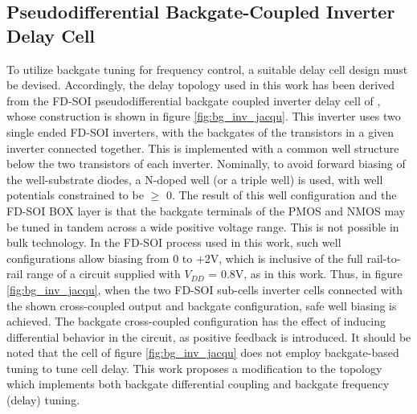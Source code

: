 



		
		\FloatBarrier\pagebreak
		\subsection{Pseudodifferential Backgate-Coupled Inverter Delay Cell}\label{sec:pd_inv}
		To utilize backgate tuning for frequency control, a suitable delay cell design must be devised. Accordingly, the delay topology used in this work has been derived from the FD-SOI pseudodifferential backgate coupled inverter delay cell of \cite{Jacquemod2019}, whose construction is shown in figure \ref{fig:bg_inv_jacqu}. This inverter uses two single ended FD-SOI inverters, with the backgates of the transistors in a given inverter connected together. This is implemented with a common well structure below the two transistors of each inverter. Nominally, to avoid forward biasing of the well-substrate diodes, a N-doped well (or a triple well) is used, with well potentials constrained to be $\geq$ 0. The result of this well configuration and the FD-SOI BOX layer is that the backgate terminals of the PMOS and NMOS may be tuned in tandem across a wide positive voltage range. This is not possible in bulk technology. In the FD-SOI process used in this work, such well configurations allow biasing from 0 to +2V, which is inclusive of the full rail-to-rail range of a circuit supplied with $V_{DD}$ = 0.8V, as in this work. Thus, in figure \ref{fig:bg_inv_jacqu}, when the two FD-SOI sub-cells inverter cells connected with the shown cross-coupled output and backgate configuration, safe well biasing is achieved. The backgate cross-coupled configuration has the effect of inducing differential behavior in the circuit, as positive feedback is introduced. It should be noted that the cell of figure \ref{fig:bg_inv_jacqu} does not employ backgate-based tuning to tune cell delay. This work proposes a modification to the topology which implements both backgate differential coupling and backgate frequency (delay) tuning.

